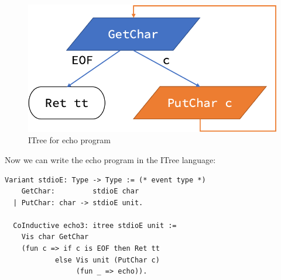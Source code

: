 \begin{figure}
  \includegraphics[width=.5\linewidth]{figures/echo-itree}
  \caption{ITree for echo program}
  \label{fig:echo-itree}
\end{figure}

Now we can write the echo program in the ITree language:
\begin{lstlisting}[style=customcoq]
  Variant stdioE: Type -> Type := (* event type *)
    GetChar:         stdioE char
  | PutChar: char -> stdioE unit.

  CoInductive echo3: itree stdioE unit :=
    Vis char GetChar
    (fun c => if c is EOF then Ret tt
            else Vis unit (PutChar c)
                 (fun _ => echo)).
\end{lstlisting}

